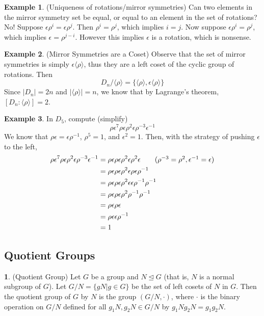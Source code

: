 \documentclass[12pt]{article}
\theoremstyle{definition}
\newtheorem{definition}{\color{NavyBlue}{\textbf{Definition}}}
\newcommand{\e}{\epsilon}
\newtheorem{example}{\color{WildStrawberry}Example}
\theoremstyle{definition}
\begin{document}
\begin{example}(Uniqueness of rotations/mirror symmetries)
Can two elements in the mirror symmetry set be equal, or equal to an element in the set of rotations? No! Suppose $\e \rho^i = \e \rho^j$. Then $\rho^i = \rho^j$, which implies $i = j$. Now suppose $\e \rho^i = \rho^j$, which implies $\e = \rho^{j-i}$. However this implies $\e$ is a rotation, which is nonsense.
\end{example}

\begin{example}(Mirror Symmetries are a Coset)
Observe that the set of mirror symmetries is simply $\e \langle \rho \rangle$, thus they are a left coset of the cyclic group of rotations.  Then
\begin{equation}
	D_n / \langle \rho \rangle = \{ \langle \rho \rangle, \e \langle \rho \rangle\}
\end{equation}
Since $|D_n| = 2n$ and $|\langle \rho \rangle| = n$, we know that by Lagrange's theorem, $[D_n : \langle \rho \rangle] = 2$. 
\end{example}

\begin{example}
In $D_5$, compute (simplify)
\begin{equation}
\rho \e^7 \rho \e \rho^2 \e \rho^{-3} \e^{-1}
\end{equation}
We know that $\rho \e = \e \rho^{-1}$, $\rho^5 = 1$, and $\e^2 = 1$. Then, with the strategy of pushing $\e$ to the left,
\begin{align*}
	\rho \e^7 \rho \e \rho^2 \e \rho^{-3} \e^{-1} &= \rho \e \rho \e \rho^2 \e \rho^{2} \e \tag{$\rho^{-3} = \rho^{2}, \e^{-1} = \e$} \\
	&= \rho \e \rho \e \rho^2 \e \rho \e \rho^{-1} \\
	&= \rho \e \rho \e \rho^2 \e \e \rho^{-1} \rho^{-1} \\
	&= \rho \e \rho \e \rho^2 \rho^{-1} \rho^{-1} \\
	&= \rho \e \rho \e \\
	&= \rho \e \e \rho^{-1} \\
	&= 1
\end{align*}
\end{example}

\subsection{Quotient Groups}

\begin{definition}(Quotient Group)
Let $G$ be a group and $N \trianglelefteq G$ (that is, $N$ is a normal subgroup of $G$). Let $G/N = \{gN|g \in G\}$ be the set of left cosets of $N$ in $G$. Then the quotient group of $G$ by $N$ is the group $(G/N, \cdot)$, where $\cdot$ is the binary operation on $G/N$ defined for all $g_1 N, g_2 N \in G / N$ by $g_1 N g_2 N = g_1g_2N$. 
\end{definition}
\end{document}
